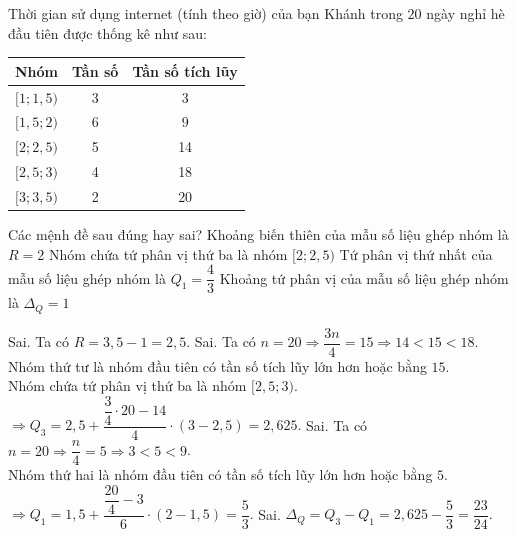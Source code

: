 \begin{ex}%
	Thời gian sử dụng internet (tính theo giờ) của bạn Khánh trong $20$ ngày nghỉ hè đầu tiên được thống kê như sau:
	\begin{center}
		\begin{tabular}{|c|c|c|}
			\hline Nhóm & Tần số & Tần số tích lũy \\
			\hline$[1 ; 1{,}5)$ & 3 & 3 \\
			\hline$[1{,}5 ; 2)$ & 6 & 9 \\
			\hline$[2 ; 2{,}5)$ & 5 & 14 \\
			\hline$[2{,}5 ; 3)$ & 4 & 18 \\
			\hline$[3 ; 3{,}5)$ & 2 & 20 \\
			\hline
		\end{tabular}
	\end{center}
	Các mệnh đề sau đúng hay sai?
	\choiceTF
	{Khoảng biến thiên của mẫu số liệu ghép nhóm là $R=2$}
	{Nhóm chứa tứ phân vị thứ ba là nhóm $[2 ; 2{,}5)$}
	{ Tứ phân vị thứ nhất của mẫu số liệu ghép nhóm là $Q_1=\dfrac{4}{3}$}
	{Khoảng tứ phân vị của mẫu số liệu ghép nhóm là $\Delta_Q=1$}
	\loigiai
	{
		\begin{itemchoice}
			\itemch Sai. Ta có $R=3{,}5-1=2{,}5$.
			\itemch Sai. Ta có $n=20 \Rightarrow \dfrac{3 n}{4}=15 \Rightarrow 14<15<18$.\\
			Nhóm thứ tư là nhóm đầu tiên có tần số tích lũy lớn hơn hoặc bằng $15$.\\
			Nhóm chứa tứ phân vị thứ ba là nhóm $[2{,}5 ; 3)$.\\
			$
			\Rightarrow Q_3=2{,}5+\dfrac{\dfrac{3}{4} \cdot 20-14}{4} \cdot(3-2{,}5)=2{,}625.
			$
			\itemch Sai. Ta có $n=20 \Rightarrow \dfrac{n}{4}=5 \Rightarrow 3<5<9$.\\
			Nhóm thứ hai là nhóm đầu tiên có tần số tích lũy lớn hơn hoặc bằng $5$.\\
			$
			\Rightarrow Q_1=1{,}5+\dfrac{\dfrac{20}{4}-3}{6} \cdot (2-1{,}5)=\dfrac{5}{3}.
			$
			\itemch Sai. $
			\Delta_Q=Q_3-Q_1=2{,}625-\dfrac{5}{3}=\dfrac{23}{24}.
			$
		\end{itemchoice}
	}
\end{ex}

